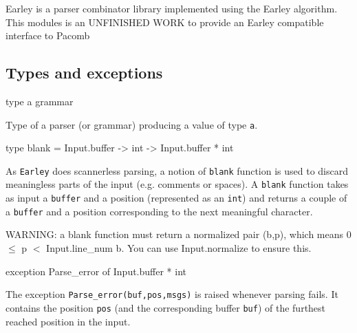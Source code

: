 \documentclass[11pt]{article}
\begin{document}
Earley is a parser combinator library implemented using  the  Earley
    algorithm. This modules is an UNFINISHED WORK to provide an Earley
    compatible interface to Pacomb



\subsection{Types and exceptions}




\label{type:Earley.grammar}\begin{ocamldoccode}
type {\textquotesingle}a grammar 
\end{ocamldoccode}
\begin{ocamldocdescription}
Type of a parser (or grammar) producing a value of type {\tt{{\textquotesingle}a}}.


\end{ocamldocdescription}




\label{type:Earley.blank}\begin{ocamldoccode}
type blank = Input.buffer -> int -> Input.buffer * int 
\end{ocamldoccode}
\begin{ocamldocdescription}
As {\tt{Earley}} does scannerless parsing, a notion of  {\tt{blank}}  function
    is used to discard meaningless parts of the input (e.g. comments  or
    spaces). A {\tt{blank}} function takes as input a {\tt{buffer}} and a position
    (represented as an {\tt{int}}) and returns a couple of a {\tt{buffer}}  and  a
    position corresponding to the next meaningful character.


    WARNING: a blank function must return a normalized pair (b,p),
    which means 0 $\leq$ p $<$ Input.line\_num b. You can use Input.normalize
    to ensure this.


\end{ocamldocdescription}




\label{exception:Earley.Parse-underscoreerror}\begin{ocamldoccode}
exception Parse_error of Input.buffer * int
\end{ocamldoccode}
\begin{ocamldocdescription}
The exception {\tt{Parse\_error(buf,pos,msgs)}} is raised whenever parsing
    fails. It contains the position {\tt{pos}} (and the corresponding  buffer
    {\tt{buf}}) of the furthest reached position in the input.


\end{ocamldocdescription}
\end{document}

